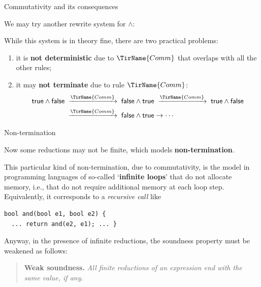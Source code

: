 \documentclass[compress,dvipdfmx]{beamer}
\newcommand{\true}{\textsf{true}\xspace}
\newcommand{\false}{\textsf{false}\xspace}
\begin{document}
%
\begin{frame}{Commutativity and its consequences}

  We may try another rewrite system for \(\wedge\):
  While this system is in theory fine, there are two practical
  problems:
  \begin{enumerate}

    \item it is \textbf{not deterministic} due to \(\TirName{Comm}\)
      that overlaps with all the other rules;

    \item it may \textbf{not terminate} due to rule
      \(\TirName{Comm}\):
      \begin{align*}
        \true \wedge \false
        & \;\xrightarrow{\TirName{Comm}}\;
        \false \wedge \true \;\xrightarrow{\TirName{Comm}}\; \true
        \wedge \false\\
        & \;\xrightarrow{\TirName{Comm}}\; \false
        \wedge \true \rightarrow \cdots
      \end{align*}

  \end{enumerate}

\end{frame}

%
\begin{frame}[fragile]{Non-termination}

  Now some reductions may not be finite, which models
  \textbf{non\hyp{}termination}.

  \bigskip

  This particular kind of non-termination, due to commutativity, is
  the model in programming languages of so-called `\textbf{infinite
    loops}' that do not allocate memory, i.e., that do not require
  additional memory at each loop step. Equivalently, it corresponds to
  a \emph{recursive call} like
{\small
\begin{verbatim}
bool and(bool e1, bool e2) {
  ... return and(e2, e1); ... }
\end{verbatim}
}
  Anyway, in the presence of infinite reductions, the soundness
  property must be weakened as follows:

  \bigskip

  \begin{quote}
    \textbf{Weak soundness.} \emph{All finite reductions of an
    expression end with the same value, if any.}
  \end{quote}

\end{frame}
\end{document}
